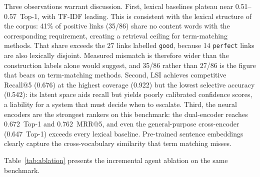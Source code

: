 \documentclass[a4paper,fleqn]{cas-sc}
\begin{document}
Three observations warrant discussion.
First, lexical baselines plateau near 0.51--0.57~Top-1, with TF-IDF leading.
This is consistent with the lexical structure of the corpus: 41\% of positive links (35/86) share no content words with the corresponding requirement, creating a retrieval ceiling for term-matching methods.
That share exceeds the 27 links labelled \texttt{good}, because 14 \texttt{perfect} links are also lexically disjoint.
Measured mismatch is therefore wider than the construction labels alone would suggest, and 35/86 rather than 27/86 is the figure that bears on term-matching methods.
Second, LSI achieves competitive Recall@5 (0.676) at the highest coverage (0.922) but the lowest selective accuracy (0.542): its latent space aids recall but yields poorly calibrated confidence scores, a liability for a system that must decide when to escalate.
Third, the neural encoders are the strongest rankers on this benchmark: the dual-encoder reaches 0.672~Top-1 and 0.762~MRR@5, and even the general-purpose cross-encoder (0.647~Top-1) exceeds every lexical baseline. Pre-trained sentence embeddings clearly capture the cross-vocabulary similarity that term matching misses.

Table~\ref{tab:ablation} presents the incremental agent ablation on the same benchmark.

\begin{table}[htbp]
\caption{Agent ablation on the diagnostic benchmark. Repeated-holdout protocol, mean $\pm$ 95\% CI over 30 seeds; $\Delta$ is the marginal Top-1 gain over the previous row. Ranking metrics are decision-independent. The coverage and selective-accuracy columns are the reason this table uses holdouts: they need a calibrated threshold. The Top-1 column is descriptive here; Table~\ref{tab:multi} gives the primary figure.}
\label{tab:ablation}
\centering
\setlength{\tabcolsep}{3pt}
\small
{}
\end{table}
\end{document}
